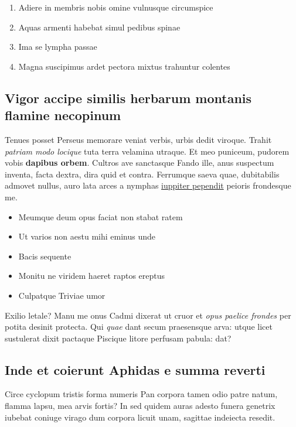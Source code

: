 \documentclass[
]{scrartcl}
\providecommand{\tightlist}{%
  \setlength{\itemsep}{0pt}\setlength{\parskip}{0pt}}
\begin{document}
\begin{enumerate}
\def\labelenumi{\arabic{enumi}.}
\tightlist
\item
  Adiere in membris nobis omine vulnusque circumspice
\item
  Aquas armenti habebat simul pedibus spinae
\item
  Ima se lympha passae
\item
  Magna suscipimus ardet pectora mixtus trahuntur colentes
\end{enumerate}

\subsection{Vigor accipe similis herbarum montanis flamine
necopinum}\label{vigor-accipe-similis-herbarum-montanis-flamine-necopinum}

Tenues posset Perseus memorare veniat verbis, urbis dedit viroque.
Trahit \emph{patriam modo locique} tuta terra velamina utraque. Et meo
puniceum, pudorem vobis \textbf{dapibus orbem}. Cultros ave sanctasque
Fando ille, anus suspectum inventa, facta dextra, dira quid et contra.
Ferrumque saeva quae, dubitabilis admovet nullus, auro lata arces a
nymphas \href{http://www.tot.net/}{iuppiter pependit} peioris frondesque
me.

\begin{itemize}
\tightlist
\item
  Meumque deum opus faciat non stabat ratem
\item
  Ut varios non aestu mihi eminus unde
\item
  Bacis sequente
\item
  Monitu ne viridem haeret raptos ereptus
\item
  Culpatque Triviae umor
\end{itemize}

Exilio letale? Manu me onus Cadmi dixerat ut cruor et \emph{opus paelice
frondes} per potita desinit protecta. Qui \emph{quae} dant secum
praesensque arva: utque licet sustulerat dixit pactaque Piscique litore
perfusam pabula: dat?

\subsection{Inde et coierunt Aphidas e summa
reverti}\label{inde-et-coierunt-aphidas-e-summa-reverti}

Circe cyclopum tristis forma numeris Pan corpora tamen odio patre natum,
flamma lapsu, mea arvis fortis? In sed quidem auras adesto funera
genetrix iubebat coniuge virago dum corpora licuit unam, sagittae
indeiecta resedit.
\end{document}
